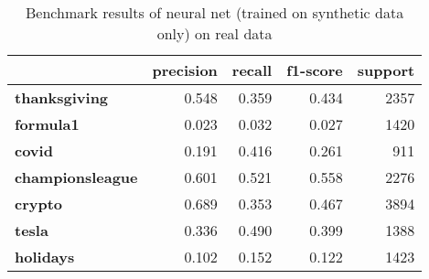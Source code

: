 \begin{table}
\centering
\caption{Benchmark results of neural net (trained on synthetic data only) on real data}
\begin{tabular}{lrrrr}
\toprule
{} &  precision &  recall &  f1-score &  support \\
\midrule
\textbf{thanksgiving   } &      0.548 &   0.359 &     0.434 &     2357 \\
\textbf{formula1       } &      0.023 &   0.032 &     0.027 &     1420 \\
\textbf{covid          } &      0.191 &   0.416 &     0.261 &      911 \\
\textbf{championsleague} &      0.601 &   0.521 &     0.558 &     2276 \\
\textbf{crypto         } &      0.689 &   0.353 &     0.467 &     3894 \\
\textbf{tesla          } &      0.336 &   0.490 &     0.399 &     1388 \\
\textbf{holidays       } &      0.102 &   0.152 &     0.122 &     1423 \\
\bottomrule
\end{tabular}
\end{table}
